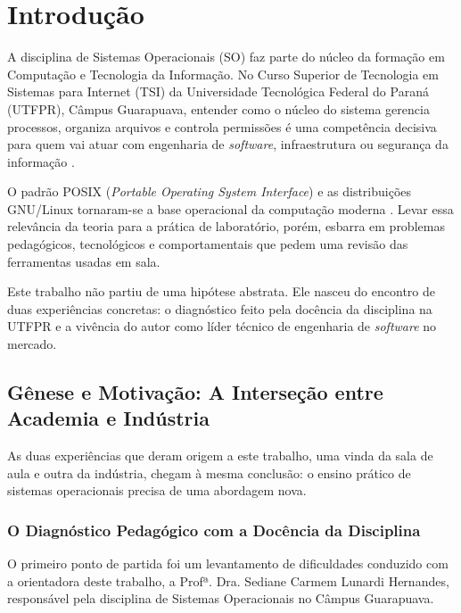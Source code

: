\chapter{Introdução}
\label{cap:introducao}

A disciplina de Sistemas Operacionais (SO) faz parte do núcleo da formação em Computação e Tecnologia da Informação. No Curso Superior de Tecnologia em Sistemas para Internet (TSI) da Universidade Tecnológica Federal do Paraná (UTFPR), Câmpus Guarapuava, entender como o núcleo do sistema gerencia processos, organiza arquivos e controla permissões é uma competência decisiva para quem vai atuar com engenharia de \textit{software}, infraestrutura ou segurança da informação \cite{silberschatz2018operating, tanenbaum2015modern}.

O padrão POSIX (\textit{Portable Operating System Interface}) e as distribuições GNU/Linux tornaram-se a base operacional da computação moderna \cite{posix2018, kerrisk2010linux}. Levar essa relevância da teoria para a prática de laboratório, porém, esbarra em problemas pedagógicos, tecnológicos e comportamentais que pedem uma revisão das ferramentas usadas em sala.

Este trabalho não partiu de uma hipótese abstrata. Ele nasceu do encontro de duas experiências concretas: o diagnóstico feito pela docência da disciplina na UTFPR e a vivência do autor como líder técnico de engenharia de \textit{software} no mercado.

\section{Gênese e Motivação: A Interseção entre Academia e Indústria}
\label{sec:genese-motivacao}

As duas experiências que deram origem a este trabalho, uma vinda da sala de aula e outra da indústria, chegam à mesma conclusão: o ensino prático de sistemas operacionais precisa de uma abordagem nova.

\subsection{O Diagnóstico Pedagógico com a Docência da Disciplina}
O primeiro ponto de partida foi um levantamento de dificuldades conduzido com a orientadora deste trabalho, a Profª. Dra. Sediane Carmem Lunardi Hernandes, responsável pela disciplina de Sistemas Operacionais no Câmpus Guarapuava.

